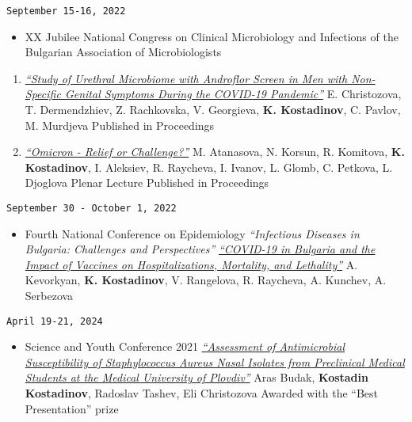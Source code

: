 \documentclass[
  12pt,
  letterpaper,
  DIV=11,
  numbers=noendperiod]{scrartcl}
\providecommand{\tightlist}{%
  \setlength{\itemsep}{0pt}\setlength{\parskip}{0pt}}\usepackage{longtable,booktabs,array}
\begin{document}
\texttt{September\ 15-16,\ 2022}

\begin{itemize}
\tightlist
\item
  XX Jubilee National Congress on Clinical Microbiology and Infections
  of the Bulgarian Association of Microbiologists
\end{itemize}

\begin{enumerate}
\def\labelenumi{\arabic{enumi}.}
\item
  \href{https://www.bam-bg.net/images/documents/3Posters.pdf}{\emph{``Study
  of Urethral Microbiome with Androflor Screen in Men with Non-Specific
  Genital Symptoms During the COVID-19 Pandemic''}} \textbar{} E.
  Christozova, T. Dermendzhiev, Z. Rachkovska, V. Georgieva, \textbf{K.
  Kostadinov}, C. Pavlov, M. Murdjeva \textbar{} Published in
  Proceedings
\item
  \href{https://www.bam-bg.net/images/documents/2Abstracts.pdf}{\emph{``Omicron
  - Relief or Challenge?''}} \textbar{} M. Atanasova, N. Korsun, R.
  Komitova, \textbf{K. Kostadinov}, I. Aleksiev, R. Raycheva, I. Ivanov,
  L. Glomb, C. Petkova, L. Djoglova \textbar{} Plenar Lecture \textbar{}
  Published in Proceedings
\end{enumerate}

\texttt{September\ 30\ -\ October\ 1,\ 2022}

\begin{itemize}
\tightlist
\item
  Fourth National Conference on Epidemiology \textbar{}
  \emph{``Infectious Diseases in Bulgaria: Challenges and
  Perspectives''} \textbar{}
  \href{http://bulepid.org/_upload2018/PROGRAMA\%202022-pre-final\%20-\%20Copy.pdf}{\emph{``COVID-19
  in Bulgaria and the Impact of Vaccines on Hospitalizations, Mortality,
  and Lethality''}} \textbar{} A. Kevorkyan, \textbf{K. Kostadinov}, V.
  Rangelova, R. Raycheva, A. Kunchev, A. Serbezova
\end{itemize}

\texttt{April\ 19-21,\ 2024}

\begin{itemize}
\tightlist
\item
  Science and Youth Conference 2021 \textbar{}
  \href{https://asclepius.bg/cnm/wp-content/uploads/2024/04/SY-DMS-2024-abstracts-web.pdf}{\emph{``Assessment
  of Antimicrobial Susceptibility of Staphylococcus Aureus Nasal
  Isolates from Preclinical Medical Students at the Medical University
  of Plovdiv''}} \textbar{} Aras Budak, \textbf{Kostadin Kostadinov},
  Radoslav Tashev, Eli Christozova \textbar{} Awarded with the ``Best
  Presentation'' prize
\end{itemize}
\end{document}

